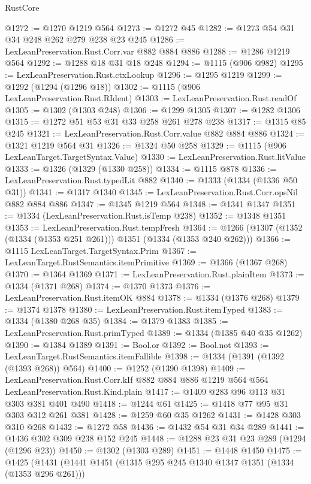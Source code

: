 \begin{lexlean}{RustCore}
\begin{coremodule}
@1272 := @1270 @1219 @564
@1273 := @1272 @45
@1282 := @1273 @54 @31 @34 @248 @262 @279 @238 @23 @245
@1286 := LexLeanPreservation.Rust.Corr.var @882 @884 @886
@1288 := @1286 @1219 @564
@1292 := @1288 @18 @31 @18 @248
@1294 := @1115 (@906 @982)
@1295 := LexLeanPreservation.Rust.ctxLookup
@1296 := @1295 @1219
@1299 := @1292 (@1294 (@1296 @18))
@1302 := @1115 (@906 LexLeanPreservation.Rust.RIdent)
@1303 := LexLeanPreservation.Rust.readOf
@1305 := @1302 (@1303 @248)
@1306 := @1299 @1305
@1307 := @1282 @1306
@1315 := @1272 @51 @53 @31 @33 @258 @261 @278 @238
@1317 := @1315 @85 @245
@1321 := LexLeanPreservation.Rust.Corr.value @882 @884 @886
@1324 := @1321 @1219 @564 @31
@1326 := @1324 @50 @258
@1329 := @1115 (@906 LexLeanTarget.TargetSyntax.Value)
@1330 := LexLeanPreservation.Rust.litValue
@1333 := @1326 (@1329 (@1330 @258))
@1334 := @1115 @878
@1336 := LexLeanPreservation.Rust.typedLit @882
@1340 := @1333 (@1334 (@1336 @50 @31))
@1341 := @1317 @1340
@1345 := LexLeanPreservation.Rust.Corr.opsNil @882 @884 @886
@1347 := @1345 @1219 @564
@1348 := @1341 @1347
@1351 := @1334 (LexLeanPreservation.Rust.isTemp @238)
@1352 := @1348 @1351
@1353 := LexLeanPreservation.Rust.tempFresh
@1364 := @1266 (@1307 (@1352 (@1334 (@1353 @251 @261))) @1351 (@1334 (@1353 @240 @262)))
@1366 := @1115 LexLeanTarget.TargetSyntax.Prim
@1367 := LexLeanTarget.RustSemantics.itemPrimitive
@1369 := @1366 (@1367 @268)
@1370 := @1364 @1369
@1371 := LexLeanPreservation.Rust.plainItem
@1373 := @1334 (@1371 @268)
@1374 := @1370 @1373
@1376 := LexLeanPreservation.Rust.itemOK @884
@1378 := @1334 (@1376 @268)
@1379 := @1374 @1378
@1380 := LexLeanPreservation.Rust.itemTyped
@1383 := @1334 (@1380 @268 @35)
@1384 := @1379 @1383
@1385 := LexLeanPreservation.Rust.primTyped
@1389 := @1334 (@1385 @40 @35 @1262)
@1390 := @1384 @1389
@1391 := Bool.or
@1392 := Bool.not
@1393 := LexLeanTarget.RustSemantics.itemFallible
@1398 := @1334 (@1391 (@1392 (@1393 @268)) @564)
@1400 := @1252 (@1390 @1398)
@1409 := LexLeanPreservation.Rust.Corr.kIf
    @882
    @884
    @886
    @1219
    @564
    @564
    LexLeanPreservation.Rust.Kind.plain
@1417 := @1409 @283 @96 @113 @31 @303 @381 @401 @490
@1418 := @1244 @61
@1425 := @1418 @77 @95 @31 @303 @312 @261 @381
@1428 := @1259 @60 @35 @1262
@1431 := @1428 @303 @310 @268
@1432 := @1272 @58
@1436 := @1432 @54 @31 @34 @289
@1441 := @1436 @302 @309 @238 @152 @245
@1448 := @1288 @23 @31 @23 @289 (@1294 (@1296 @23))
@1450 := @1302 (@1303 @289)
@1451 := @1448 @1450
@1475 := @1425
    (@1431
      (@1441
        @1451
        (@1315 @295 @245 @1340 @1347 @1351 (@1334 (@1353 @296 @261)))

\end{coremodule}
\end{lexlean}
